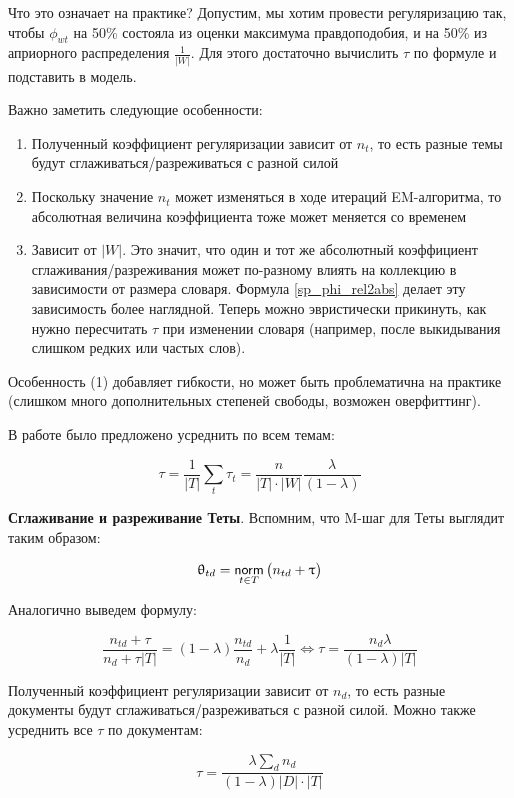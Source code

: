 Что это означает на практике? Допустим, мы хотим провести регуляризацию так, чтобы $\phi_{wt}$ на 50\% состояла из оценки максимума правдоподобия, и на 50\% из априорного распределения $\frac{1}{|W|}$. Для этого достаточно вычислить $\tau$ по формуле и подставить в модель.

Важно заметить следующие особенности: 

\begin{enumerate}
    \item  {Полученный коэффициент регуляризации зависит от $n_t$, то есть разные темы будут сглаживаться/разреживаться с разной силой}
    \item  {Поскольку значение $n_t$ может изменяться в ходе итераций EM-алгоритма, то абсолютная величина коэффициента тоже может меняется со временем}
    \item  {Зависит от $|W|$. Это значит, что один и тот же абсолютный коэффициент сглаживания/разреживания может по-разному влиять на коллекцию в зависимости от размера словаря.  Формула \ref{sp_phi_rel2abs} делает эту зависимость более наглядной. Теперь можно эвристически прикинуть, как нужно пересчитать $\tau$ при изменении словаря (например, после выкидывания слишком редких или частых слов).}
\end{enumerate}

Особенность (1) добавляет гибкости, но может быть проблематична на практике (слишком много дополнительных степеней свободы, возможен оверфиттинг).

В работе \cite{doykov} было предложено усреднить по всем темам:

\[
\tau = \frac{1}{|T|} \sum_t \tau_t = \frac{n}{|T|\cdot|W|} \frac{\lambda}{(1-\lambda)}
\]

\textbf{Сглаживание и разреживание Теты}. Вспомним, что M-шаг для Теты выглядит таким образом:

\[
\uptheta_{td} = \mathop{\mathsf{norm}}\limits_{t \in T} \big( n_{td} + \uptau \big)
\]

Аналогично выведем формулу:

\[
\frac{n_{td} + \tau}{n_d + \tau |T|} = (1-\lambda) \frac{n_{td}}{n_d} + \lambda \frac{1}{|T|} \iff \tau = \frac{n_d \lambda}{(1-\lambda) |T|} \label{sp_theta_rel2abs} 
\]

Полученный коэффициент регуляризации зависит от $n_d$, то есть разные документы будут сглаживаться/разреживаться с разной силой. Можно также усреднить все $\tau$ по документам:

\[
\tau = \frac{\lambda \sum_d n_d }{(1-\lambda) |D| \cdot |T|} 
\]

